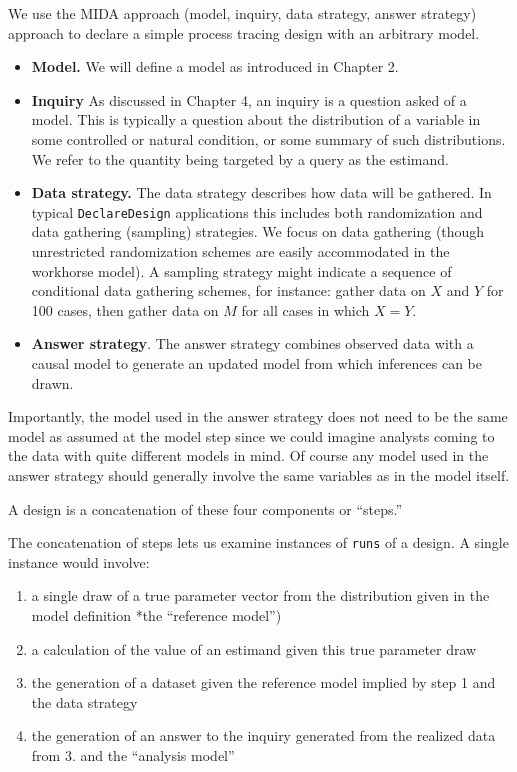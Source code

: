 \documentclass[
  12pt,
]{book}
\providecommand{\tightlist}{%
  \setlength{\itemsep}{0pt}\setlength{\parskip}{0pt}}
\begin{document}
We use the MIDA approach (model, inquiry, data strategy, answer strategy) approach to declare a simple process tracing design with an arbitrary model.

\begin{itemize}
\item
  \textbf{Model.} We will define a model as introduced in Chapter 2.
\item
  \textbf{Inquiry} As discussed in Chapter 4, an inquiry is a question asked of a model. This is typically a question about the distribution of a variable in some controlled or natural condition, or some summary of such distributions. We refer to the quantity being targeted by a query as the estimand.
\item
  \textbf{Data strategy.} The data strategy describes how data will be gathered. In typical \texttt{DeclareDesign} applications this includes both randomization and data gathering (sampling) strategies. We focus on data gathering (though unrestricted randomization schemes are easily accommodated in the workhorse model). A sampling strategy might indicate a sequence of conditional data gathering schemes, for instance: gather data on \(X\) and \(Y\) for 100 cases, then gather data on \(M\) for all cases in which \(X=Y\).
\item
  \textbf{Answer strategy}. The answer strategy combines observed data with a causal model to generate an updated model from which inferences can be drawn.
\end{itemize}

Importantly, the model used in the answer strategy does not need to be the same model as assumed at the model step since we could imagine analysts coming to the data with quite different models in mind. Of course any model used in the answer strategy should generally involve the same variables as in the model itself.

A design is a concatenation of these four components or ``steps.''

The concatenation of steps lets us examine instances of \texttt{runs} of a design. A single instance would involve:

\begin{enumerate}
\def\labelenumi{\arabic{enumi}.}
\tightlist
\item
  a single draw of a true parameter vector from the distribution given in the model definition *the ``reference model'')
\item
  a calculation of the value of an estimand given this true parameter draw
\item
  the generation of a dataset given the reference model implied by step 1 and the data strategy
\item
  the generation of an answer to the inquiry generated from the realized data from 3. and the ``analysis model''
\end{enumerate}
\end{document}
